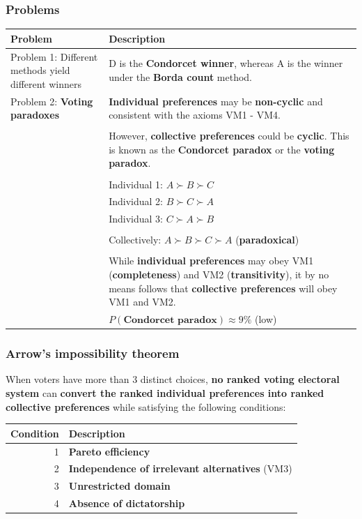 \documentclass[11pt]{article}
\begin{document}
\subsubsection{Problems}
\label{sec:orgf1ef849}
\begin{center}
\begin{tabular}{|m{8em}|m{25em}|}
\hline
Problem & Description\\
\hline
Problem 1: Different methods yield different winners & D is the \textbf{Condorcet winner}, whereas A is the winner under the \textbf{Borda count} method.\\
\hline
Problem 2: \textbf{Voting paradoxes} & \textbf{Individual preferences} may be \textbf{non-cyclic} and consistent with the axioms VM1 - VM4.\\
 & \\
 & However, \textbf{collective preferences} could be \textbf{cyclic}. This is known as the \textbf{Condorcet paradox} or the \textbf{voting paradox}.\\
 & \\
 & Individual 1: \(A \succ B \succ C\)\\
 & Individual 2: \(B \succ C \succ A\)\\
 & Individual 3: \(C \succ A \succ B\)\\
 & \\
 & Collectively: \(A \succ B \succ C \succ A\) (\textbf{paradoxical})\\
 & \\
 & While \textbf{individual preferences} may obey VM1 (\textbf{completeness}) and VM2 (\textbf{transitivity}), it by no means follows that \textbf{collective preferences} will obey VM1 and VM2.\\
 & \(P(\textbf{Condorcet paradox}) \approx 9\%\) (low)\\
\hline
\end{tabular}
\end{center}
\subsubsection{Arrow's impossibility theorem}
\label{sec:org2057859}
When voters have more than 3 distinct choices, \textbf{no ranked voting electoral system} can \textbf{convert the ranked individual preferences into ranked collective preferences} while satisfying the following conditions:
\begin{center}
\begin{tabular}{r|l}
Condition & Description\\
\hline
1 & \textbf{Pareto efficiency}\\
2 & \textbf{Independence of irrelevant alternatives} (VM3)\\
3 & \textbf{Unrestricted domain}\\
4 & \textbf{Absence of dictatorship}\\
\end{tabular}
\end{center}
\end{document}
